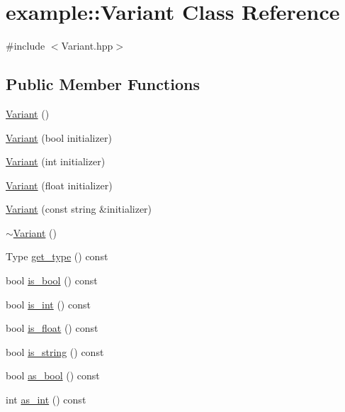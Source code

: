 \hypertarget{classexample_1_1_variant}{}\section{example\+:\+:Variant Class Reference}
\label{classexample_1_1_variant}


{\ttfamily \#include $<$Variant.\+hpp$>$}

\subsection*{Public Member Functions}
\begin{DoxyCompactItemize}
\item 
\mbox{\hyperlink{classexample_1_1_variant_ac096c2a5a9720cad22e93b0571b1c5f7}{Variant}} ()
\item 
\mbox{\hyperlink{classexample_1_1_variant_a56f08c590e0a766b09ab583d9d9b3e51}{Variant}} (bool initializer)
\item 
\mbox{\hyperlink{classexample_1_1_variant_afcc50ca905b4a00f1ac9f59d9a519419}{Variant}} (int initializer)
\item 
\mbox{\hyperlink{classexample_1_1_variant_ab3d2575f4d99b284e050653adb1f46b4}{Variant}} (float initializer)
\item 
\mbox{\hyperlink{classexample_1_1_variant_a455035577828744db2a5458258a7e004}{Variant}} (const string \&initializer)
\item 
\mbox{\hyperlink{classexample_1_1_variant_a114ad1c9bec20329250885a53c752090}{$\sim$\+Variant}} ()
\item 
Type \mbox{\hyperlink{classexample_1_1_variant_a6a3d4d13495c981af8b9f2dda6b2d871}{get\+\_\+type}} () const
\item 
bool \mbox{\hyperlink{classexample_1_1_variant_a93478e5cc349b995a7202872eecffb5d}{is\+\_\+bool}} () const
\item 
bool \mbox{\hyperlink{classexample_1_1_variant_a6e3b2b78c5ba29922ec9a4b0f0ca7d93}{is\+\_\+int}} () const
\item 
bool \mbox{\hyperlink{classexample_1_1_variant_aae9104f86b8852fc19bc10cc17d36066}{is\+\_\+float}} () const
\item 
bool \mbox{\hyperlink{classexample_1_1_variant_ad0a37487f71d111288d0c5dc87ffb739}{is\+\_\+string}} () const
\item 
bool \mbox{\hyperlink{classexample_1_1_variant_ab1b278f63d9e9d29f7e76c7a1f1da39f}{as\+\_\+bool}} () const
\item 
int \mbox{\hyperlink{classexample_1_1_variant_ac76f235af3792c2f38ce9a8f1c98798e}{as\+\_\+int}} () const

\end{DoxyCompactItemize}
